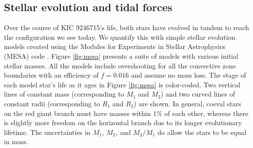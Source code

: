 \subsection{Stellar evolution and tidal forces}\label{tides}
Over the course of KIC 9246715's life, both stars have evolved in tandem to reach the configuration we see today. We quantify this with simple stellar evolution models created using the Modules for Experiments in Stellar Astrophysics (MESA) code \citep{pax11,pax13,pax15}. Figure \ref{fig:mesa} presents a suite of models with various initial stellar masses. All the models include overshooting for all the convective zone boundaries with an efficiency of $f = 0.016$ \citep{her00} and assume no mass loss. The stage of each model star's life as it ages in Figure \ref{fig:mesa} is color-coded. Two vertical lines of constant mass (corresponding to $M_1$ and $M_2$) and two curved lines of constant radii (corresponding to $R_1$ and $R_2$) are shown. In general, coeval stars on the red giant branch must have masses within $1\%$ of each other, whereas there is slightly more freedom on the horizontal branch due to its longer evolutionary lifetime. The uncertainties in $M_1$, $M_2$, and $M_2/M_1$ do allow the stars to be equal in mass.

